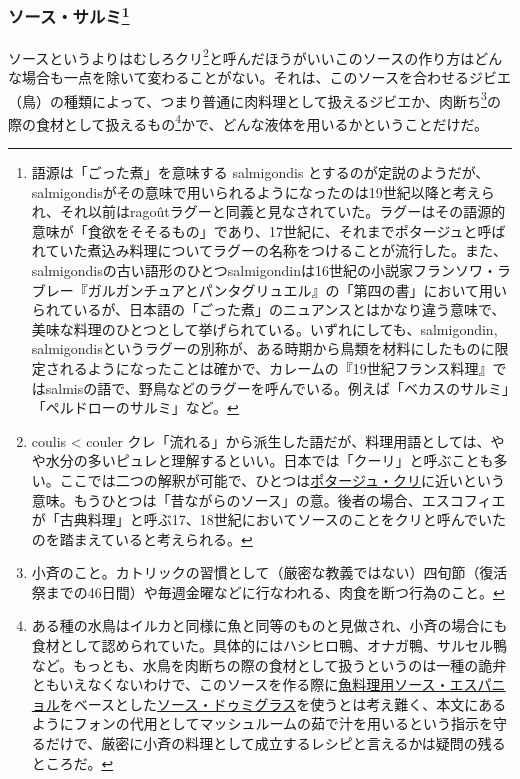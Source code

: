 \begin{recette}
\hypertarget{sauce-salmis}{%
\subsubsection[ソース・サルミ]{\texorpdfstring{ソース・サルミ\footnote{語源は「ごった煮」を意味する
  salmigondis
  とするのが定説のようだが、salmigondisがその意味で用いられるようになったのは19世紀以降と考えられ、それ以前はragoûtラグーと同義と見なされていた。ラグーはその語源的意味が「食欲をそそるもの」であり、17世紀に、それまでポタージュと呼ばれていた煮込み料理についてラグーの名称をつけることが流行した。また、salmigondisの古い語形のひとつsalmigondinは16世紀の小説家フランソワ・ラブレー『ガルガンチュアとパンタグリュエル』の「第四の書」において用いられているが、日本語の「ごった煮」のニュアンスとはかなり違う意味で、美味な料理のひとつとして挙げられている。いずれにしても、salmigondin,
  salmigondisというラグーの別称が、ある時期から鳥類を材料にしたものに限定されるようになったことは確かで、カレームの『19世紀フランス料理』ではsalmisの語で、野鳥などのラグーを呼んでいる。例えば「ベカスのサルミ」「ペルドローのサルミ」など。}}{ソース・サルミ}}\label{sauce-salmis}}



ソースというよりはむしろクリ\footnote{coulis \textless{} couler
  クレ「流れる」から派生した語だが、料理用語としては、やや水分の多いピュレと理解するといい。日本では「クーリ」と呼ぶことも多い。ここでは二つの解釈が可能で、ひとつは\protect\hyperlink{}{ポタージュ・クリ}に近いという意味。もうひとつは「昔ながらのソース」の意。後者の場合、エスコフィエが「古典料理」と呼ぶ17、18世紀においてソースのことをクリと呼んでいたのを踏まえていると考えられる。}と呼んだほうがいいこのソースの作り方はどんな場合も一点を除いて変わることがない。それは、このソースを合わせるジビエ（鳥）の種類によって、つまり普通に肉料理として扱えるジビエか、肉断ち\footnote{小斉のこと。カトリックの習慣として（厳密な教義ではない）四旬節（復活祭までの46日間）や毎週金曜などに行なわれる、肉食を断つ行為のこと。}の際の食材として扱えるもの\footnote{ある種の水鳥はイルカと同様に魚と同等のものと見做され、小斉の場合にも食材として認められていた。具体的にはハシヒロ鴨、オナガ鴨、サルセル鴨など。もっとも、水鳥を肉断ちの際の食材として扱うというのは一種の詭弁ともいえなくないわけで、このソースを作る際に\protect\hyperlink{sauce-espagnole-maigre}{魚料理用ソース・エスパニョル}をベースとした\protect\hyperlink{sauce-demi-glace}{ソース・ドゥミグラス}を使うとは考え難く、本文にあるようにフォンの代用としてマッシュルームの茹で汁を用いるという指示を守るだけで、厳密に小斉の料理として成立するレシピと言えるかは疑問の残るところだ。}かで、どんな液体を用いるかということだけだ。


\end{recette}
